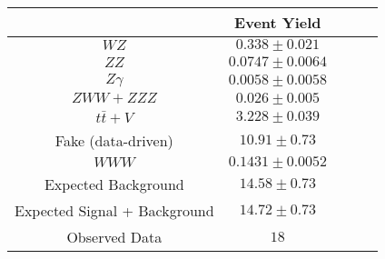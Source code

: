 \begin{tabular}{|c||c|c|c|c|}
\hline
 & Event Yield\\ 
\hline\hline
$WZ$ &  $0.338 \pm 0.021$\\ 
$ZZ$ &  $0.0747 \pm 0.0064$\\ 
$Z\gamma$ &  $0.0058 \pm 0.0058$\\ 
$ZWW+ZZZ$ &  $0.026 \pm 0.005$\\ 
$t\bar{t}+V$ &  $3.228 \pm 0.039$\\ 
Fake (data-driven) &  $10.91 \pm 0.73$\\ 
$WWW$ &  $0.1431 \pm 0.0052$\\ 
\hline
Expected Background &  $14.58 \pm 0.73$\\ 
Expected Signal + Background &  $14.72 \pm 0.73$\\ 
\hline
Observed Data &  $18$\\ 
\hline
\end{tabular}

